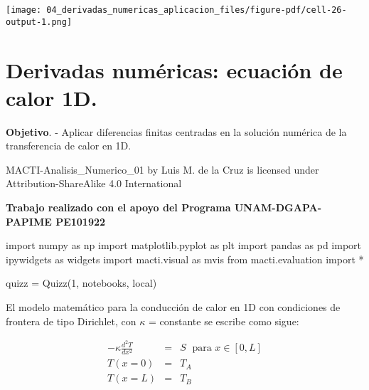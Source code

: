 \documentclass[
  letterpaper,
  DIV=11,
  numbers=noendperiod]{scrreprt}
\newenvironment{Shaded}{\begin{snugshade}}{\end{snugshade}}
\newcommand{\ImportTok}[1]{\textcolor[rgb]{0.00,0.46,0.62}{#1}}
\newcommand{\NormalTok}[1]{\textcolor[rgb]{0.00,0.23,0.31}{#1}}
\newcommand{\OperatorTok}[1]{\textcolor[rgb]{0.37,0.37,0.37}{#1}}
\newcommand{\StringTok}[1]{\textcolor[rgb]{0.13,0.47,0.30}{#1}}
\begin{document}
\texttt{[image: 04\_derivadas\_numericas\_aplicacion\_files/figure-pdf/cell-26-output-1.png]}


\chapter{Derivadas numéricas: ecuación de calor
1D.}\label{derivadas-numuxe9ricas-ecuaciuxf3n-de-calor-1d.}

\textbf{Objetivo}. - Aplicar diferencias finitas centradas en la
solución numérica de la transferencia de calor en 1D.

MACTI-Analisis\_Numerico\_01 by Luis M. de la Cruz is licensed under
Attribution-ShareAlike 4.0 International

\textbf{Trabajo realizado con el apoyo del Programa UNAM-DGAPA-PAPIME
PE101922}

\begin{Shaded}
\begin{Highlighting}[]
\ImportTok{import}\NormalTok{ numpy }\ImportTok{as}\NormalTok{ np}
\ImportTok{import}\NormalTok{ matplotlib.pyplot }\ImportTok{as}\NormalTok{ plt}
\ImportTok{import}\NormalTok{ pandas }\ImportTok{as}\NormalTok{ pd}
\ImportTok{import}\NormalTok{ ipywidgets }\ImportTok{as}\NormalTok{ widgets}
\ImportTok{import}\NormalTok{ macti.visual }\ImportTok{as}\NormalTok{ mvis}
\ImportTok{from}\NormalTok{ macti.evaluation }\ImportTok{import} \OperatorTok{*}
\end{Highlighting}
\end{Shaded}

\begin{Shaded}
\begin{Highlighting}[]
\NormalTok{quizz }\OperatorTok{=}\NormalTok{ Quizz(}\StringTok{\textquotesingle{}1\textquotesingle{}}\NormalTok{, }\StringTok{\textquotesingle{}notebooks\textquotesingle{}}\NormalTok{, }\StringTok{\textquotesingle{}local\textquotesingle{}}\NormalTok{)}
\end{Highlighting}
\end{Shaded}

El modelo matemático para la conducción de calor en 1D con condiciones
de frontera de tipo Dirichlet, con \(\kappa\) = constante se escribe
como sigue:

\[
\begin{eqnarray}
-\kappa \frac{d^2T}{dx^2} & = & S \; \text{ para } x \in [0,L] \\
T(x=0) & = & T_A \\
T(x=L) & = & T_B
\end{eqnarray}
\]
\end{document}
